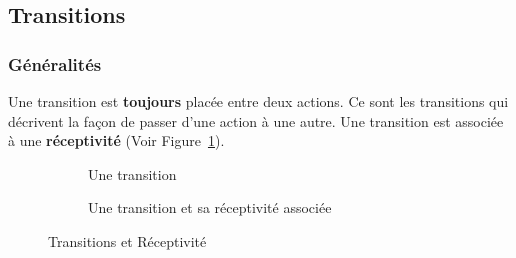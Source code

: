 \subsection{Transitions}
\subsubsection{Généralités}
Une transition est \textbf{toujours} placée entre deux actions. Ce sont les transitions qui décrivent la façon de passer d'une action à une autre.
Une transition est associée à une \textbf{réceptivité} (Voir Figure~\ref{fig:transition}).


\begin{figure}[ht]
  \centering
  \begin{subfigure}[b]{.48\textwidth}
    \centering
    \caption{Une transition}
    \label{fig:transition}
  \end{subfigure}
  \begin{subfigure}[b]{.48\textwidth}
    \centering
    \caption{Une transition et sa réceptivité associée}
    \label{fig:transitionEtRecept}
  \end{subfigure}
  \caption{Transitions et Réceptivité}
\end{figure}
